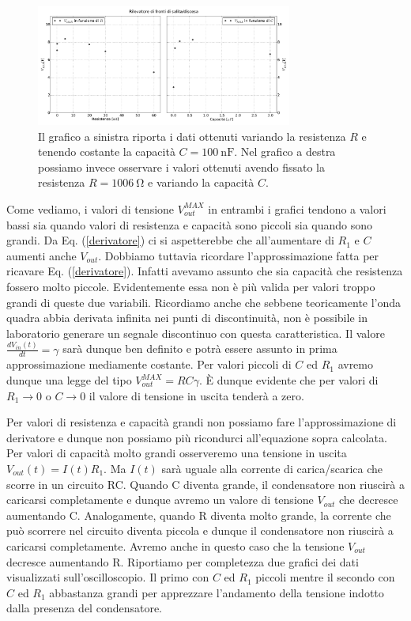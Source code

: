\begin{figure}[h]
\center
	\includegraphics[width=0.75\textwidth]{dati.pdf}
	\caption{Il grafico a sinistra riporta i dati ottenuti variando la resistenza $R$ e tenendo costante la capacità $C = \SI{100}{\nano\farad}$. Nel grafico a destra possiamo invece osservare i valori ottenuti avendo fissato la resistenza $R=\SI{1006}{\ohm}$ e variando la capacità $C$.}
	\label{fig:dati}
\end{figure}


Come vediamo, i valori di tensione $V_{out}^{MAX}$ in entrambi i grafici tendono a valori bassi sia quando valori di resistenza e capacità sono piccoli sia quando sono grandi. Da Eq. (\ref{derivatore}) ci si aspetterebbe che all'aumentare di $R_1$ e $C$ aumenti anche $V_{out}$. Dobbiamo tuttavia ricordare l'approssimazione fatta per ricavare Eq. (\ref{derivatore}). Infatti avevamo assunto che sia capacità che resistenza fossero molto piccole. Evidentemente essa non è più valida per valori troppo grandi di queste due variabili. Ricordiamo anche che sebbene teoricamente l'onda quadra abbia derivata infinita nei punti di discontinuità, non è possibile in laboratorio generare un segnale discontinuo con questa caratteristica. Il valore $\frac{dV_{in}(t)}{dt}=\gamma$  sarà dunque ben definito e potrà essere assunto in prima approssimazione mediamente costante. Per valori piccoli di $C$ ed $R_1$ avremo dunque una legge del tipo $V_{out}^{MAX}= RC \gamma$. \`E dunque evidente che per valori di $R_1\rightarrow 0$ o $C\rightarrow 0$ il valore di tensione in uscita tenderà a zero.

Per valori di resistenza e capacità grandi non possiamo fare l'approssimazione di derivatore e dunque non possiamo più ricondurci all'equazione sopra calcolata. Per valori di capacità molto grandi osserveremo una tensione in uscita $V_{out}(t)=I(t) R_1$. Ma $I(t)$ sarà uguale alla corrente di carica/scarica che scorre in un circuito RC. Quando C diventa grande, il condensatore non riuscirà a caricarsi completamente e dunque avremo un valore di tensione $V_{out}$ che decresce aumentando C. Analogamente, quando R diventa molto grande, la corrente che può scorrere nel circuito diventa piccola e dunque il condensatore non riuscirà a caricarsi completamente. Avremo anche in questo caso che la tensione $V_{out}$ decresce aumentando R. Riportiamo per completezza due grafici dei dati visualizzati sull'oscilloscopio. Il primo con $C$ ed $R_1$ piccoli mentre il secondo con $C$ ed $R_1$ abbastanza grandi per apprezzare l'andamento della tensione indotto dalla presenza del condensatore.


